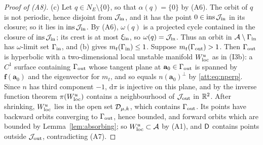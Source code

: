 \begin{proof}[Proof of (A8)]
(c) Let $q\in N_E\setminus\{0\}$, so that $\alpha(q)=\{0\}$ by (A6). The orbit of $q$ is not periodic, hence disjoint from $\mathcal J_{\rm in}$, and it has the point $0\in\operatorname{ins}\mathcal J_{\rm in}$ in its closure; so it lies in $\operatorname{ins}\mathcal J_{\rm in}$. By (A6), $\omega(q)$ is a projected cycle contained in the closure of $\operatorname{ins}\mathcal J_{\rm in}$; its crest is at most $\xi_{\rm in}$, so $\omega(q)=\mathcal J_{\rm in}$. Thus an orbit in $\mathcal A\setminus\Gamma_{\rm in}$ has $\omega$-limit set $\Gamma_{\rm in}$, and (b) gives $m_t(\Gamma_{\rm in})\le1$. Suppose $m_t(\Gamma_{\rm out})>1$. Then $\Gamma_{\rm out}$ is hyperbolic with a two-dimensional local unstable manifold $W^u_{\rm loc}$ as in (I3b): a $C^1$ surface containing $\Gamma_{\rm out}$ whose tangent plane at $\mathbf a_0\in\Gamma_{\rm out}$ is spanned by $\mathbf f(\mathbf a_0)$ and the eigenvector for $m_t$, and so equals $n(\mathbf a_0)^\perp$ by \eqref{att:eq:nperp}. Since $n$ has third component $-1$, $\mathrm d\pi$ is injective on this plane, and by the inverse function theorem $\pi(W^u_{\rm loc})$ contains a neighbourhood of $\mathcal J_{\rm out}$ in $\mathbb R^2$. After shrinking, $W^u_{\rm loc}$ lies in the open set $\mathcal D_{\mu,k}$, which contains $\Gamma_{\rm out}$. Its points have backward orbits converging to $\Gamma_{\rm out}$, hence bounded, and forward orbits which are bounded by Lemma~\ref{lem:absorbing}; so $W^u_{\rm loc}\subset\mathcal A$ by (A1), and $\mathsf D$ contains points outside $\mathcal J_{\rm out}$, contradicting (A7).


\end{proof}
